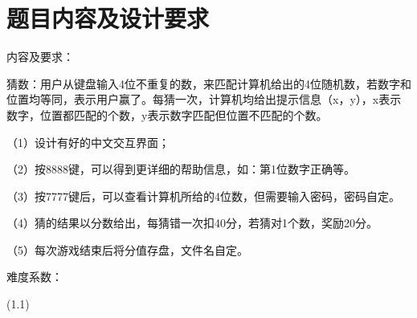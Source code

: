 \section{题目内容及设计要求}

内容及要求：

猜数：用户从键盘输入4位不重复的数，来匹配计算机给出的4位随机数，若数字和位置均等同，表示用户赢了。每猜一次，计算机均给出提示信息（x，y），x表示数字，位置都匹配的个数，y表示数字匹配但位置不匹配的个数。

（1）设计有好的中文交互界面；

（2）按8888键，可以得到更详细的帮助信息，如：第1位数字正确等。

（3）按7777键后，可以查看计算机所给的4位数，但需要输入密码，密码自定。

（4）猜的结果以分数给出，每猜错一次扣40分，若猜对1个数，奖励20分。

（5）每次游戏结束后将分值存盘，文件名自定。


难度系数：

(1.1)
